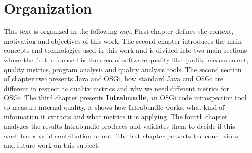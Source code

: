  
\section{Organization}

This text is organized in the following way. First chapter defines the context, motivation and objectives of this work. The second chapter introduces the main concepts and technologies used in this work and is divided into two main sections where the first is focused in the area of software quality like quality measurement, quality metrics, program analysis and quality analysis tools. The second section of chapter two presents Java and OSGi, how standard Java and OSGi are different in respect to quality metrics and why we need different metrics for OSGi. The third chapter presents \textbf{Intrabundle}, an OSGi code introspection tool to measure internal quality, it shows how Intrabundle works, what kind of information it extracts and what metrics it is applying. The fourth chapter analyzes the results Intrabundle produces and validates them to decide if this work has a valid contribution or not. The last chapter presents the conclusions and future work on this subject.